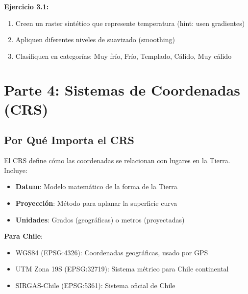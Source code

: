 \documentclass[11pt,a4paper]{article}
\newcommand{\concepto}[2]{\begin{tcolorbox}[colback=blue!5,colframe=usachblue,title={#1}]#2\end{tcolorbox}}
\newcommand{\ejercicio}[1]{\begin{tcolorbox}[colback=red!5,colframe=red,title={Ejercicio}]#1\end{tcolorbox}}
\begin{document}
\ejercicio{
\textbf{Ejercicio 3.1:} 
\begin{enumerate}
    \item Creen un raster sintético que represente temperatura (hint: usen gradientes)
    \item Apliquen diferentes niveles de suavizado (smoothing)
    \item Clasifiquen en categorías: Muy frío, Frío, Templado, Cálido, Muy cálido
\end{enumerate}
}

\newpage

\section{Parte 4: Sistemas de Coordenadas (CRS)}

\subsection{Por Qué Importa el CRS}

\concepto{Sistema de Referencia de Coordenadas}{
El CRS define cómo las coordenadas se relacionan con lugares en la Tierra. Incluye:
\begin{itemize}
    \item \textbf{Datum}: Modelo matemático de la forma de la Tierra
    \item \textbf{Proyección}: Método para aplanar la superficie curva
    \item \textbf{Unidades}: Grados (geográficas) o metros (proyectadas)
\end{itemize}

\textbf{Para Chile}:
\begin{itemize}
    \item WGS84 (EPSG:4326): Coordenadas geográficas, usado por GPS
    \item UTM Zona 19S (EPSG:32719): Sistema métrico para Chile continental
    \item SIRGAS-Chile (EPSG:5361): Sistema oficial de Chile
\end{itemize}
}
\end{document}
